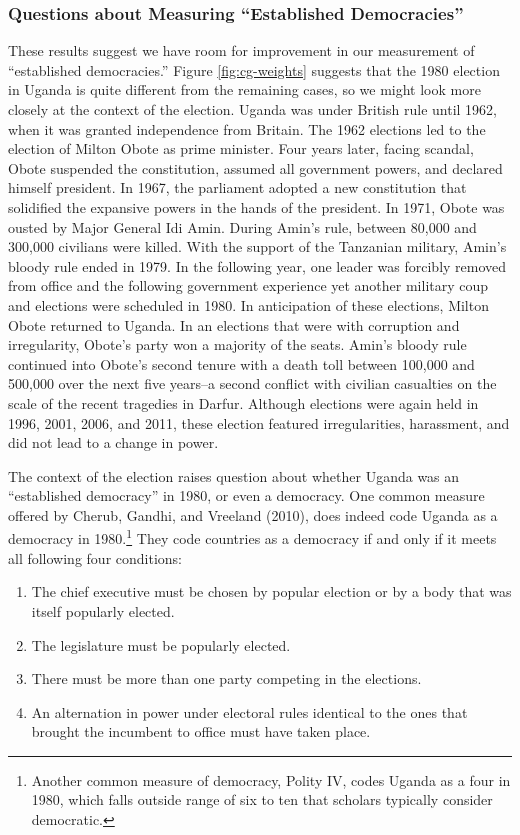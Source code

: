 \documentclass[12pt]{article}
\begin{document}
\subsubsection*{Questions about Measuring ``Established Democracies''}

These results suggest we have room for improvement in our measurement of ``established democracies.'' 
Figure \ref{fig:cg-weights} suggests that the 1980 election in Uganda is quite different from the remaining cases, so we might look more closely at the context of the election.
Uganda was under British rule until 1962, when it was granted independence from Britain. 
The 1962 elections led to the election of Milton Obote as prime minister. 
Four years later, facing scandal, Obote suspended the constitution, assumed all government powers, and declared himself president. 
In 1967, the parliament adopted a new constitution that solidified the expansive powers in the hands of the president. 
In 1971, Obote was ousted by Major General Idi Amin. During Amin's rule, between 80,000 and 300,000 civilians were killed. 
With the support of the Tanzanian military, Amin's bloody rule ended in 1979. 
In the following year, one leader was forcibly removed from office and the following government experience yet another military coup and elections were scheduled in 1980. 
In anticipation of these elections, Milton Obote returned to Uganda. 
In an elections that were with corruption and irregularity, Obote's party won a majority of the seats. 
Amin's bloody rule continued into Obote's second tenure with a death toll between 100,000 and 500,000 over the next five years--a second conflict with civilian casualties on the scale of the recent tragedies in Darfur. 
Although elections were again held in 1996, 2001, 2006, and 2011, these election featured irregularities, harassment, and did not lead to a change in power.

The context of the election raises question about whether Uganda was an ``established democracy'' in 1980, or even a democracy. 
One common measure offered by Cherub, Gandhi, and Vreeland (2010), does indeed code Uganda as a democracy in 1980.\footnote{Another common measure of democracy, Polity IV, codes Uganda as a four in 1980, which falls outside range of six to ten that scholars typically consider democratic.} 
They code countries as a democracy if and only if it meets all following four conditions:
\begin{enumerate}
\item The chief executive must be chosen by popular election or by a body that was itself popularly elected.
\item The legislature must be popularly elected.
\item There must be more than one party competing in the elections.
\item An alternation in power under electoral rules identical to the ones that brought the incumbent to office must have taken place.
\end{enumerate}
\end{document}

